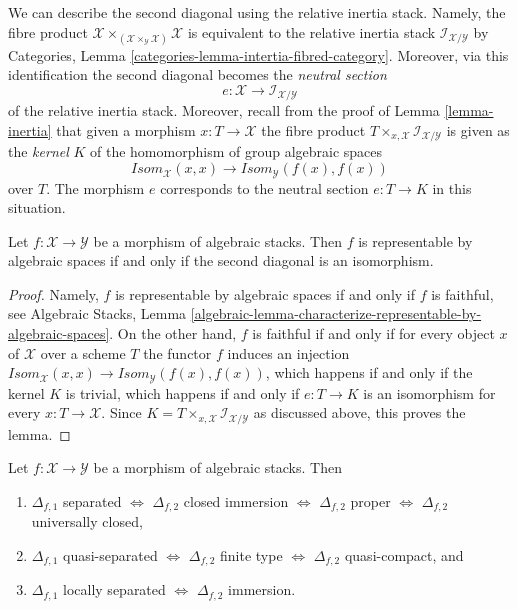 \medskip\noindent
We can describe the second diagonal using the relative inertia stack.
Namely, the fibre product
$\mathcal{X}
\times_{(\mathcal{X} \times_{\mathcal{Y}} \mathcal{X})} \mathcal{X}$
is equivalent to the relative inertia stack
$\mathcal{I}_{\mathcal{X}/\mathcal{Y}}$ by
Categories, Lemma \ref{categories-lemma-intertia-fibred-category}.
Moreover, via this identification the second diagonal becomes the
{\it neutral section}
$$
e : \mathcal{X} \to \mathcal{I}_{\mathcal{X}/\mathcal{Y}}
$$
of the relative inertia stack. Moreover, recall from the proof of
Lemma \ref{lemma-inertia}
that given a morphism $x : T \to \mathcal{X}$ the fibre product
$T \times_{x, \mathcal{X}} \mathcal{I}_{\mathcal{X}/\mathcal{Y}}$
is given as the {\it kernel} $K$ of the homomorphism of group algebraic spaces
$$
\mathit{Isom}_{\mathcal{X}}(x, x)
\longrightarrow
\mathit{Isom}_{\mathcal{Y}}(f(x), f(x))
$$
over $T$. The morphism $e$ corresponds to the neutral section
$e : T \to K$ in this situation.

\begin{lemma}
\label{lemma-second-diagonal}
Let $f : \mathcal{X} \to \mathcal{Y}$ be a morphism of algebraic stacks.
Then $f$ is representable by algebraic spaces if and only if
the second diagonal is an isomorphism.
\end{lemma}

\begin{proof}
Namely, $f$ is representable by algebraic spaces if and only if $f$ is
faithful, see
Algebraic Stacks,
Lemma \ref{algebraic-lemma-characterize-representable-by-algebraic-spaces}.
On the other hand, $f$ is faithful if and only if for every object $x$
of $\mathcal{X}$ over a scheme $T$ the functor $f$ induces an injection
$\mathit{Isom}_{\mathcal{X}}(x, x) \to
\mathit{Isom}_{\mathcal{Y}}(f(x), f(x))$,
which happens if and only if the kernel $K$ is trivial, which happens if and
only if $e : T \to K$ is an isomorphism for every $x : T \to \mathcal{X}$.
Since $K = T \times_{x, \mathcal{X}} \mathcal{I}_{\mathcal{X}/\mathcal{Y}}$
as discussed above, this proves the lemma.
\end{proof}

\begin{lemma}
\label{lemma-first-diagonal-separated-second-diagonal-closed}
Let $f : \mathcal{X} \to \mathcal{Y}$ be a morphism of algebraic stacks.
Then
\begin{enumerate}
\item $\Delta_{f, 1}$ separated $\Leftrightarrow$
$\Delta_{f, 2}$ closed immersion $\Leftrightarrow$
$\Delta_{f, 2}$ proper $\Leftrightarrow$
$\Delta_{f, 2}$ universally closed,
\item $\Delta_{f, 1}$ quasi-separated $\Leftrightarrow$
$\Delta_{f, 2}$ finite type $\Leftrightarrow$ $\Delta_{f, 2}$ quasi-compact,
and
\item $\Delta_{f, 1}$ locally separated $\Leftrightarrow$
$\Delta_{f, 2}$ immersion.
\end{enumerate}
\end{lemma}

